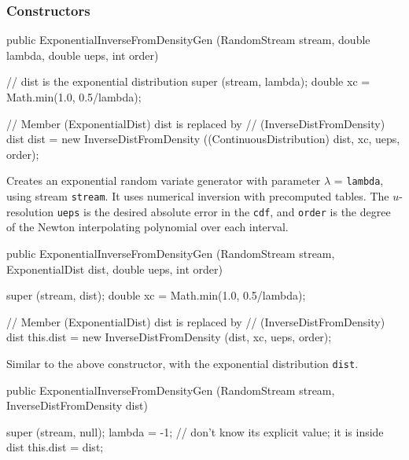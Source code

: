\subsubsection* {Constructors}
\begin{code}

   public ExponentialInverseFromDensityGen (RandomStream stream,
                                            double lambda,
                                            double ueps, int order) \begin{hide} {
      // dist is the exponential distribution
      super (stream, lambda);
      double xc = Math.min(1.0, 0.5/lambda);

      // Member (ExponentialDist) dist is replaced by 
      // (InverseDistFromDensity) dist
      dist = new InverseDistFromDensity ((ContinuousDistribution) dist,
                                         xc, ueps, order);
    }\end{hide}
\end{code} 
\begin{tabb} Creates an exponential random variate generator with
 parameter $\lambda $ = \texttt{lambda}, using stream \texttt{stream}.
It uses numerical inversion with precomputed tables.
The $u$-resolution \texttt{ueps} is the desired absolute error in the 
\texttt{cdf}, and \texttt{order} is the degree of the Newton interpolating 
polynomial over each interval.
\end{tabb}
\begin{code}

   public ExponentialInverseFromDensityGen (RandomStream stream, 
                                            ExponentialDist dist,
                                            double ueps, int order) \begin{hide} {
      super (stream, dist);
      double xc = Math.min(1.0, 0.5/lambda);

      // Member (ExponentialDist) dist is replaced by 
      // (InverseDistFromDensity) dist
      this.dist = new InverseDistFromDensity (dist, xc, ueps, order);
   } \end{hide}
\end{code}
 \begin{tabb}  Similar to the above constructor, with the exponential 
   distribution \texttt{dist}.  
 \end{tabb}
\begin{code}

   public ExponentialInverseFromDensityGen (RandomStream stream, 
                                            InverseDistFromDensity dist) \begin{hide} {
      super (stream, null);
      lambda = -1;   // don't know its explicit value; it is inside dist
      this.dist = dist;
   } \end{hide}
\end{code}
